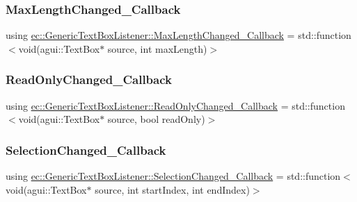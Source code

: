 \subsubsection{\texorpdfstring{Max\+Length\+Changed\+\_\+\+Callback}{MaxLengthChanged\_Callback}}
{\footnotesize\ttfamily using \mbox{\hyperlink{classec_1_1_generic_text_box_listener_ae0559ffa241ec16797f0554715b7b632}{ec\+::\+Generic\+Text\+Box\+Listener\+::\+Max\+Length\+Changed\+\_\+\+Callback}} =  std\+::function$<$void(agui\+::\+Text\+Box$\ast$ source, int max\+Length)$>$}

\mbox{\label{classec_1_1_generic_text_box_listener_a2046d1c27dca4b40f4bc373a3ce2be1e}} 
\subsubsection{\texorpdfstring{Read\+Only\+Changed\+\_\+\+Callback}{ReadOnlyChanged\_Callback}}
{\footnotesize\ttfamily using \mbox{\hyperlink{classec_1_1_generic_text_box_listener_a2046d1c27dca4b40f4bc373a3ce2be1e}{ec\+::\+Generic\+Text\+Box\+Listener\+::\+Read\+Only\+Changed\+\_\+\+Callback}} =  std\+::function$<$void(agui\+::\+Text\+Box$\ast$ source, bool read\+Only)$>$}

\mbox{\label{classec_1_1_generic_text_box_listener_a25c554bc062fdfdc805f7aefe981a3ea}} 
\subsubsection{\texorpdfstring{Selection\+Changed\+\_\+\+Callback}{SelectionChanged\_Callback}}
{\footnotesize\ttfamily using \mbox{\hyperlink{classec_1_1_generic_text_box_listener_a25c554bc062fdfdc805f7aefe981a3ea}{ec\+::\+Generic\+Text\+Box\+Listener\+::\+Selection\+Changed\+\_\+\+Callback}} =  std\+::function$<$void(agui\+::\+Text\+Box$\ast$ source, int start\+Index, int end\+Index)$>$}

